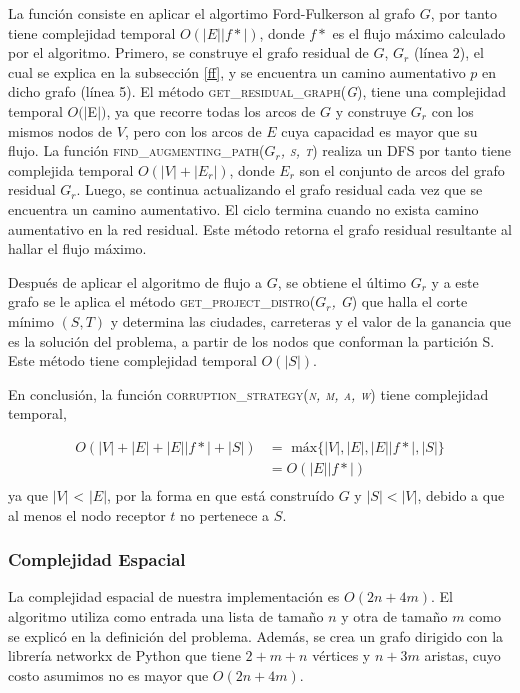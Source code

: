 \documentclass[10pt]{article} %
\begin{document}
	La funci\'on consiste en aplicar el algortimo Ford-Fulkerson al grafo $G$, por tanto tiene complejidad temporal $O(|E||f*|)$, donde $f*$ es el flujo m\'aximo calculado por el algoritmo. Primero, se construye el grafo residual de $G$,  $G_r$ (l\'inea 2), el cual se explica en la subsecci\'on \ref{ff}, y se encuentra un camino aumentativo $p$ en dicho grafo (l\'inea 5). El m\'etodo \textsc{get\_residual\_graph(\textit{G})}, tiene una complejidad temporal $O(|$E$|)$, ya que recorre todas los arcos de $G$ y construye $G_r$ con los mismos nodos de $V$, pero con los arcos de $E$ cuya capacidad es mayor que su flujo. La funci\'on \textsc{find\_augmenting\_path(\textit{$G_r$, s, t})} realiza un DFS por tanto tiene complejida temporal $O(|V| + |E_r|)$, donde $E_r$ son el conjunto de arcos del grafo residual $G_r$. Luego, se continua actualizando el grafo residual cada vez que se encuentra un camino aumentativo. El ciclo termina cuando no exista camino aumentativo en la red residual. Este m\'etodo retorna el grafo residual resultante al hallar el flujo m\'aximo.
	
	Despu\'es de aplicar el algoritmo de flujo a $G$, se obtiene el \'ultimo $G_r$ y a este grafo se le aplica el m\'etodo \textsc{get\_project\_distro(\textit{$G_r$, G})} que halla el corte m\'inimo $(S,T)$ y determina las ciudades, carreteras y el valor de la ganancia que es la soluci\'on del problema, a partir de los nodos que conforman la partici\'on S. Este m\'etodo tiene complejidad temporal $O(|S|)$.
	
	En conclusi\'on, la funci\'on \textsc{corruption\_strategy(\textit{n, m, a, w})} tiene complejidad temporal,
	
	\begin{equation}
		\begin{aligned}
			O(|V| + |E| + |E||f*| + |S|) &=\text{ m\'ax}\{|V|, |E|, |E||f*|, |S|\}\\
			&=O(|E||f*|)\\
		\end{aligned}		
	\end{equation}
	ya que $|V|$ < $|E|$, por la forma en que est\'a constru\'ido $G$ y $|S|<|V|$, debido a que al menos el nodo receptor $t$ no pertenece a $S$.

	

	\subsubsection{Complejidad Espacial}
	
	La complejidad espacial de nuestra implementaci\'on es $O(2n + 4m)$. El algoritmo utiliza como entrada una lista de tama\~no $n$ y otra de tama\~no $m$ como se explic\'o en la definici\'on del problema. Adem\'as, se crea un grafo dirigido con la librer\'ia networkx de Python que tiene $2 + m + n$ v\'ertices y $n + 3m$ aristas, cuyo costo asumimos no es mayor que $O(2n + 4m)$.
		
\end{document}
